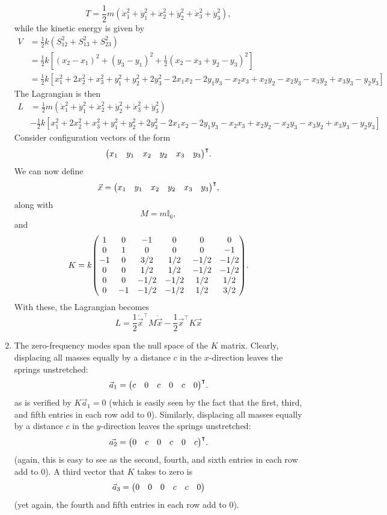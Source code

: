\documentclass[12pt]{article}
\begin{document}
\begin{enumerate}[label=\roman*.]
    \[ T = \frac{1}{2}m\left(\dot{x}_1^2 + \dot{y}_1^2 + \dot{x}_2^2 + \dot{y}_2^2 + \dot{x}_3^2 + \dot{y}_3^2\right), \]
    while the kinetic energy is given by 
    \begin{align*}
        V &= \frac{1}{2}k\left(S_{12}^2 + S_{13}^2 + S_{23}^2\right) \\
        &= \frac{1}{2}k\left[(x_2 - x_1)^2 + (y_3 - y_1)^2 + \frac{1}{2}(x_2 - x_3 + y_2 - y_3)^2\right] \\
        &= \frac{1}{2}k\left[x_1^2 + 2x_2^2 + x_3^2 + y_1^2 + y_2^2 + 2y_3^2 - 2x_1x_2 - 2y_1y_3 - x_2x_3 + x_2y_2 - x_2y_3 - x_3y_2 + x_3y_3 - y_2y_3 \right]
    \end{align*}
    The Lagrangian is then
    \begin{align*}
        L &= \frac{1}{2}m\left(\dot{x}_1^2 + \dot{y}_1^2 + \dot{x}_2^2 + \dot{y}_2^2 + \dot{x}_3^2 + \dot{y}_3^2\right) \\
        &- \frac{1}{2}k\left[x_1^2 + 2x_2^2 + x_3^2 + y_1^2 + y_2^2 + 2y_3^2 - 2x_1x_2 - 2y_1y_3 - x_2x_3 + x_2y_2 - x_2y_3 - x_3y_2 + x_3y_3 - y_2y_3 \right]
    \end{align*}
    Consider configuration vectors of the form
    \[ \mqty( x_1 &  y_1 &  x_2 &  y_2 &  x_3 &  y_3)^\intercal. \]
    We can now define
    \[ \vec{x} = \mqty(x_1 & y_1 & x_2 & y_2 & x_3 & y_3)^\intercal, \]
    along with
    \[ M = m\mathbb{I}_6, \]
    and
    \[ K = k\mqty(1 & 0 & -1 & 0 & 0 & 0 \\ 0 & 1 & 0 & 0 & 0 & -1 \\ -1 & 0 & 3/2 & 1/2 & -1/2 & -1/2 \\ 0 & 0 & 1/2 & 1/2 & -1/2 & -1/2 \\ 0 & 0 & -1/2 & -1/2 & 1/2 & 1/2 \\ 0 & -1 & -1/2 & -1/2 & 1/2 & 3/2). \]
    With these, the Lagrangian becomes
    \[ L = \frac{1}{2}\dot{\vec{x}}^\intercal M \dot{\vec{x}} - \frac{1}{2}\vec{x}^\intercal K \vec{x} \]

    \item 
    The zero-frequency modes span the null space of the $K$ matrix. Clearly, displacing all masses equally by a distance $c$ in the $x$-direction leaves the springs unstretched:
    \[ \vec{a}_1 = \mqty(c & 0 & c & 0 & c & 0 )^\intercal. \]
    as is verified by $K\vec{a}_1 = 0$ (which is easily seen by the fact that the first, third, and fifth entries in each row add to 0). Similarly, displacing all masses equally by a distance $c$ in the $y$-direction leaves the springs unstretched:
    \[ \vec{a_2} = \mqty(0 & c & 0 & c & 0 & c)^\intercal. \]
    (again, this is easy to see as the second, fourth, and sixth entries in each row add to 0). A third vector that $K$ takes to zero is
    \[ \vec{a}_3 = \mqty(0 & 0 & 0 & c & c & 0) \]
    (yet again, the fourth and fifth entries in each row add to 0).


\end{enumerate}
\end{document}
